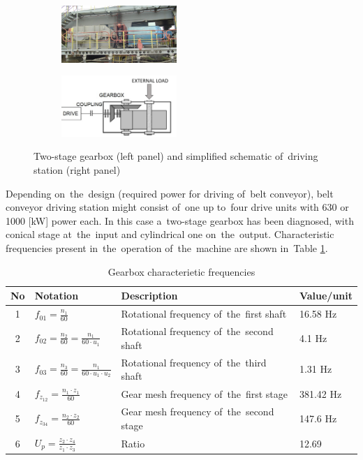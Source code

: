 \begin{figure}[!ht]
 \centering
 \begin{subfigure}
   \centering
   \includegraphics[width=0.48\textwidth]{wykresy/obj_gear.png}
 \end{subfigure}
 \begin{subfigure}
   \centering
		\includegraphics[width=0.48\textwidth]{wykresy/gb_sch2.png}
 \end{subfigure}
 \caption{Two-stage gearbox (left panel) and simplified schematic of~driving station (right panel)}
 \label{fig:obj_gear}
\end{figure}



Depending on~the~design (required power for driving of~belt conveyor), belt conveyor driving station might consist of~one up to~four drive units with 630 or 1000 [kW] power each. In this case a~two-stage gearbox has been diagnosed, with conical stage at~the~input and cylindrical one on~the~output. Characteristic frequencies present in~the~operation of~the~machine are shown in~Table \ref{tab: obj_gear}.

\begin{table}
	\begin{center}
		\begin{tabular}{|c|l|l|l|}
			
			\hline
			No & Notation & Description & Value/unit \\ \hline
			1 & $f_{01}=\frac{n_1}{60}$ & Rotational frequency of~the~first shaft & 16.58 Hz \\ \hline
			2 & $f_{02}=\frac{n_2}{60}=\frac{n_1}{60 \cdot u_1}$ & Rotational frequency of~the~second shaft & 4.1 Hz \\ \hline
			3 & $f_{03}=\frac{n_3}{60}=\frac{n_1}{60 \cdot u_1 \cdot u_2}$ & Rotational frequency of~the~third shaft & 1.31 Hz \\ \hline
			4 & $f_{z_{12}}=\frac{n_1 \cdot z_1}{60}$ & Gear mesh frequency of~the~first stage & 381.42 Hz \\ \hline
			5 & $f_{z_{34}}=\frac{n_2 \cdot z_2}{60}$ & Gear mesh frequency of~the~second stage & 147.6 Hz \\ \hline
			6 & $U_p=\frac{z_2 \cdot z_4}{z_1 \cdot z_3}$ & Ratio & 12.69 \\ \hline
			
		\end{tabular}
	\end{center} 
	\caption{Gearbox characterietic frequencies}
	\label{tab: obj_gear}
\end{table}

